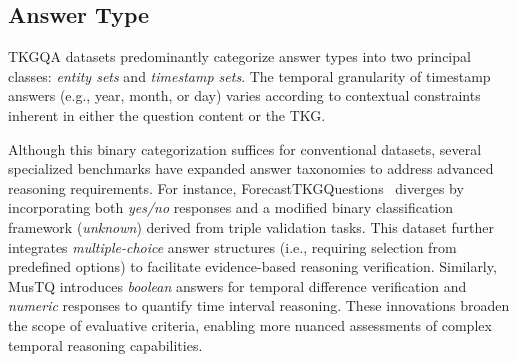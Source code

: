 \subsection{Answer Type}
\label{answertype}
TKGQA datasets predominantly categorize answer types into two principal classes: \emph{entity sets} and \emph{timestamp sets}. The temporal granularity of timestamp answers (e.g., year, month, or day) varies according to contextual constraints inherent in either the question content or the TKG. 

Although this binary categorization suffices for conventional datasets, several specialized benchmarks have expanded answer taxonomies to address advanced reasoning requirements. For instance, ForecastTKGQuestions~\cite{dingForecastTKGQuestionsBenchmarkTemporal2022} diverges by incorporating both \textit{yes/no} responses and a modified binary classification framework (\textit{unknown}) derived from triple validation tasks. This dataset further integrates \textit{multiple-choice} answer structures (i.e., requiring selection from predefined options)  to facilitate evidence-based reasoning verification. Similarly, MusTQ introduces \textit{boolean} answers for temporal difference verification and \textit{numeric} responses to quantify time interval reasoning. These innovations broaden the scope of evaluative criteria, enabling more nuanced assessments of complex temporal reasoning capabilities.


